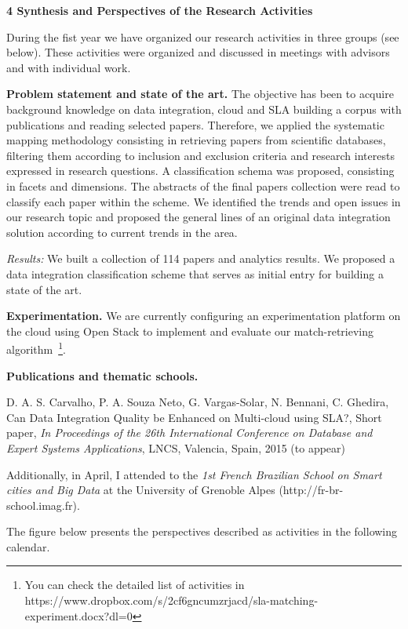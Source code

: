 \documentclass[11pt,a4paper,oneside]{report}
\begin{document}
\begin{flushleft}
\textbf{4 Synthesis and Perspectives of the Research Activities}\\
\end{flushleft}
During the fist year we have organized our research activities in three groups (see below). These activities were organized and discussed in meetings with advisors and with individual work.

\noindent
\textbf{Problem statement and state of the art.} The objective has been to acquire background knowledge on data integration, cloud and SLA building a corpus with publications  and reading selected papers. Therefore, we applied the systematic mapping methodology consisting in retrieving papers from scientific databases,   filtering them according to inclusion and exclusion criteria and research interests expressed in research questions. A classification schema was  proposed, consisting in   facets and dimensions. The abstracts of the final papers collection were read  to classify each paper within the scheme.  We identified the trends and open issues in our research topic and proposed the general lines of  an original data integration solution according to current trends in the area.

\noindent
{\em Results:} We built a collection of 114 papers and analytics results. We proposed a data integration classification scheme that serves as initial entry for building a state of the art. 

\noindent
\textbf{Experimentation.} We are currently configuring an experimentation platform on the cloud using Open Stack to implement and evaluate our match-retrieving algorithm~\footnote{You can check the detailed list of activities in https://www.dropbox.com/s/2cf6gncumzrjacd/sla-matching-experiment.docx?dl=0}.

\noindent
\textbf{Publications and thematic schools.}

\noindent
D. A. S. Carvalho, P. A. Souza Neto, G. Vargas-Solar, N. Bennani, C. Ghedira, Can Data Integration Quality be Enhanced on Multi-cloud using SLA?, Short paper, {\em In Proceedings of the 26th International Conference on Database and Expert Systems Applications}, LNCS, Valencia, Spain, 2015 (to appear)

\noindent
Additionally, in April, I attended to the \emph{1st French Brazilian School on Smart cities and Big Data} at the University of Grenoble Alpes (http://fr-br-school.imag.fr).

\noindent
The figure below presents the perspectives described as activities in the following calendar. 
\end{document}

